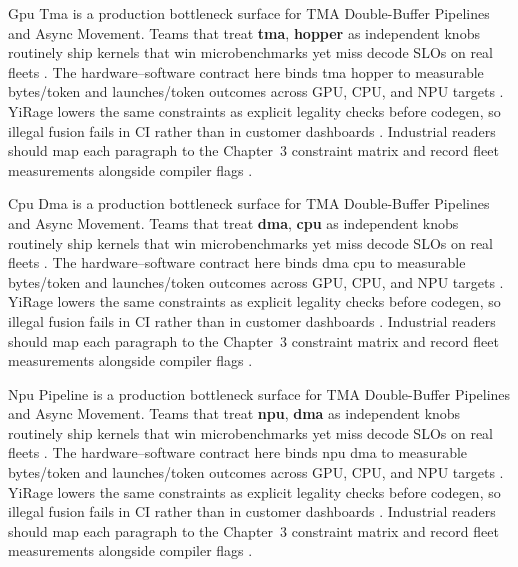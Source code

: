 Gpu Tma is a production bottleneck surface for TMA Double-Buffer Pipelines and Async Movement. Teams that treat \textbf{tma}, \textbf{hopper} as independent knobs routinely ship kernels that win microbenchmarks yet miss decode SLOs on real fleets \citep{taxbreak2026,semianalysis2024tma}. The hardware--software contract here binds tma hopper to measurable bytes/token and launches/token outcomes across GPU, CPU, and NPU targets \citep{memoryfloor2026,amd2024xdna}. YiRage lowers the same constraints as explicit legality checks before codegen, so illegal fusion fails in CI rather than in customer dashboards \citep{nvidia2022hopper,amd2024aie}. Industrial readers should map each paragraph to the Chapter~3 constraint matrix and record fleet measurements alongside compiler flags \citep{semianalysis2024tma,dlbook}.

Cpu Dma is a production bottleneck surface for TMA Double-Buffer Pipelines and Async Movement. Teams that treat \textbf{dma}, \textbf{cpu} as independent knobs routinely ship kernels that win microbenchmarks yet miss decode SLOs on real fleets \citep{memoryfloor2026,amd2024xdna}. The hardware--software contract here binds dma cpu to measurable bytes/token and launches/token outcomes across GPU, CPU, and NPU targets \citep{nvidia2022hopper,amd2024aie}. YiRage lowers the same constraints as explicit legality checks before codegen, so illegal fusion fails in CI rather than in customer dashboards \citep{semianalysis2024tma,dlbook}. Industrial readers should map each paragraph to the Chapter~3 constraint matrix and record fleet measurements alongside compiler flags \citep{amd2024xdna,dao2022flashattention}.

Npu Pipeline is a production bottleneck surface for TMA Double-Buffer Pipelines and Async Movement. Teams that treat \textbf{npu}, \textbf{dma} as independent knobs routinely ship kernels that win microbenchmarks yet miss decode SLOs on real fleets \citep{nvidia2022hopper,amd2024aie}. The hardware--software contract here binds npu dma to measurable bytes/token and launches/token outcomes across GPU, CPU, and NPU targets \citep{semianalysis2024tma,dlbook}. YiRage lowers the same constraints as explicit legality checks before codegen, so illegal fusion fails in CI rather than in customer dashboards \citep{amd2024xdna,dao2022flashattention}. Industrial readers should map each paragraph to the Chapter~3 constraint matrix and record fleet measurements alongside compiler flags \citep{amd2024aie,kwon2023vllm}.

